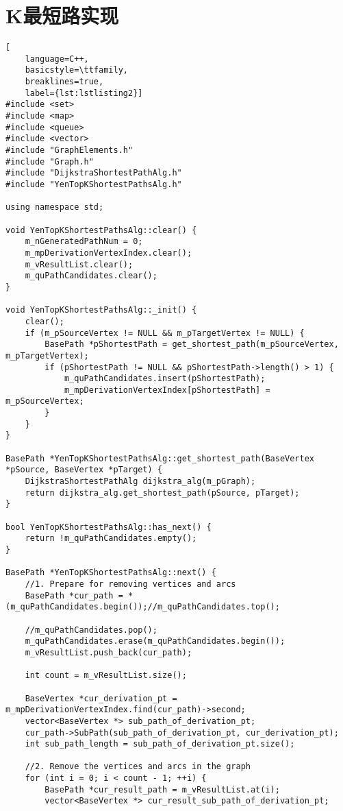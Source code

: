 \chapter{K最短路实现}\label{ch:k最短路实现}
\begin{lstlisting}[
    language=C++,
    basicstyle=\ttfamily,
    breaklines=true,
    label={lst:lstlisting2}]
#include <set>
#include <map>
#include <queue>
#include <vector>
#include "GraphElements.h"
#include "Graph.h"
#include "DijkstraShortestPathAlg.h"
#include "YenTopKShortestPathsAlg.h"

using namespace std;

void YenTopKShortestPathsAlg::clear() {
    m_nGeneratedPathNum = 0;
    m_mpDerivationVertexIndex.clear();
    m_vResultList.clear();
    m_quPathCandidates.clear();
}

void YenTopKShortestPathsAlg::_init() {
    clear();
    if (m_pSourceVertex != NULL && m_pTargetVertex != NULL) {
        BasePath *pShortestPath = get_shortest_path(m_pSourceVertex, m_pTargetVertex);
        if (pShortestPath != NULL && pShortestPath->length() > 1) {
            m_quPathCandidates.insert(pShortestPath);
            m_mpDerivationVertexIndex[pShortestPath] = m_pSourceVertex;
        }
    }
}

BasePath *YenTopKShortestPathsAlg::get_shortest_path(BaseVertex *pSource, BaseVertex *pTarget) {
    DijkstraShortestPathAlg dijkstra_alg(m_pGraph);
    return dijkstra_alg.get_shortest_path(pSource, pTarget);
}

bool YenTopKShortestPathsAlg::has_next() {
    return !m_quPathCandidates.empty();
}

BasePath *YenTopKShortestPathsAlg::next() {
    //1. Prepare for removing vertices and arcs
    BasePath *cur_path = *(m_quPathCandidates.begin());//m_quPathCandidates.top();

    //m_quPathCandidates.pop();
    m_quPathCandidates.erase(m_quPathCandidates.begin());
    m_vResultList.push_back(cur_path);

    int count = m_vResultList.size();

    BaseVertex *cur_derivation_pt = m_mpDerivationVertexIndex.find(cur_path)->second;
    vector<BaseVertex *> sub_path_of_derivation_pt;
    cur_path->SubPath(sub_path_of_derivation_pt, cur_derivation_pt);
    int sub_path_length = sub_path_of_derivation_pt.size();

    //2. Remove the vertices and arcs in the graph
    for (int i = 0; i < count - 1; ++i) {
        BasePath *cur_result_path = m_vResultList.at(i);
        vector<BaseVertex *> cur_result_sub_path_of_derivation_pt;


\end{lstlisting}
